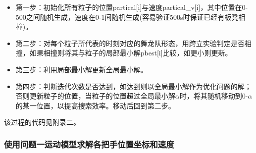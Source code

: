 \documentclass[a4paper]{article}
\begin{document}
        \begin{itemize}
            \item 第一步：初始化所有粒子的位置partical[i]与速度partical\_v[i]，其中位置在0-500之间随机生成，速度在0-1间随机生成(容易验证500s时保证已经有板凳相撞)。
            \item 第二步：对每个粒子所代表的时刻对应的舞龙队形态，用跨立实验判定是否相撞，如果相撞则将其与粒子的局部最小解pbest[i]比较，如更小则更新。
            \item 第三步：利用局部最小解更新全局最小解。
            \item 第四步：判断迭代次数是否达到，如达到则以全局最小解作为优化问题的解；否则更新粒子的位置，当粒子的位置超过全局最小解$\alpha$时，将其随机移动到0-$\alpha$的某一位置，以提高搜索效率。移动后回到第二步。
        \end{itemize}
该过程的代码见附录二。
        \subsubsection{使用问题一运动模型求解各把手位置坐标和速度}
        
        
        
\end{document}
